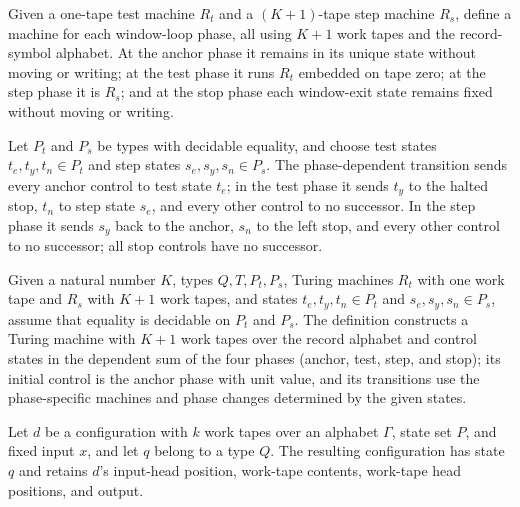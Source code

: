 \begin{definition}
\label{Turing.wl_rows}
\leanok
{}
Given a one-tape test machine $R_t$ and a $(K+1)$-tape step machine $R_s$, define a
machine for each window-loop phase, all using $K+1$ work tapes and the record-symbol
alphabet. At the anchor phase it remains in its unique state without moving or writing;
at the test phase it runs $R_t$ embedded on tape zero; at the step phase it is $R_s$;
and at the stop phase each window-exit state remains fixed without moving or writing.
\end{definition}

\begin{definition}
\label{Turing.wl_red}
\leanok
{}
Let $P_t$ and $P_s$ be types with decidable equality, and choose test states
$t_e,t_y,t_n\in P_t$ and step states $s_e,s_y,s_n\in P_s$. The phase-dependent
transition sends every anchor control to test state $t_e$; in the test phase it sends
$t_y$ to the halted stop, $t_n$ to step state $s_e$, and every other control to no
successor. In the step phase it sends $s_y$ back to the anchor, $s_n$ to the left stop,
and every other control to no successor; all stop controls have no successor.
\end{definition}

\begin{definition}
\label{Turing.wl_loopTM}
\leanok
{}
Given a natural number $K$, types $Q,T,P_t,P_s$, Turing machines $R_t$ with one work
tape and $R_s$ with $K+1$ work tapes, and states $t_e,t_y,t_n\in P_t$ and
$s_e,s_y,s_n\in P_s$, assume that equality is decidable on $P_t$ and $P_s$. The
definition constructs a Turing machine with $K+1$ work tapes over the record alphabet
and control states in the dependent sum of the four phases (anchor, test, step, and
stop); its initial control is the anchor phase with unit value, and its transitions use
the phase-specific machines and phase changes determined by the given states.
\end{definition}

\begin{definition}
\label{Turing.wl_at}
\leanok
{}
Let $d$ be a configuration with $k$ work tapes over an alphabet $\Gamma$, state set $P$,
and fixed input $x$, and let $q$ belong to a type $Q$. The resulting configuration has
state $q$ and retains $d$’s input-head position, work-tape contents, work-tape head
positions, and output.
\end{definition}

